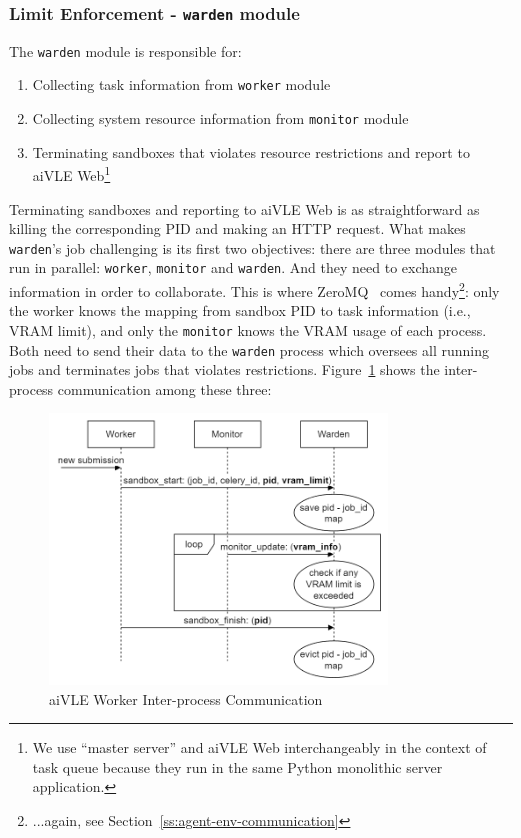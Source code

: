 \subsubsection{Limit Enforcement - \texttt{warden} module}
\label{sss:warden}
The \texttt{warden} module is responsible for:
\begin{enumerate}
    \item Collecting task information from \texttt{worker} module
    \item Collecting system resource information from \texttt{monitor} module
    \item Terminating sandboxes that violates resource restrictions and report to aiVLE Web\footnote{We use ``master server'' and aiVLE Web interchangeably in the context of task queue because they run in the same Python monolithic server application.}
\end{enumerate}

Terminating sandboxes and reporting to aiVLE Web is as straightforward as killing the corresponding PID and making an HTTP request. What makes \texttt{warden}'s job challenging is its first two objectives: there are three modules that run in parallel: \texttt{worker}, \texttt{monitor} and \texttt{warden}. And they need to exchange information in order to collaborate. This is where ZeroMQ~\cite{zeromq} comes handy\footnote{...again, see Section~\ref{ss:agent-env-communication}}: only the worker knows the mapping from sandbox PID to task information (i.e., VRAM limit), and only the \texttt{monitor} knows the VRAM usage of each process. Both need to send their data to the \texttt{warden} process which oversees all running jobs and terminates jobs that violates restrictions. Figure~\ref{fig:aivle-worker-ipc} shows the inter-process communication among these three:

\begin{figure}[H]
    \centering
    \includegraphics[width=0.8\textwidth]{images/aivle-worker-ipc.png}
    \caption{aiVLE Worker Inter-process Communication}
    \label{fig:aivle-worker-ipc}
\end{figure}

